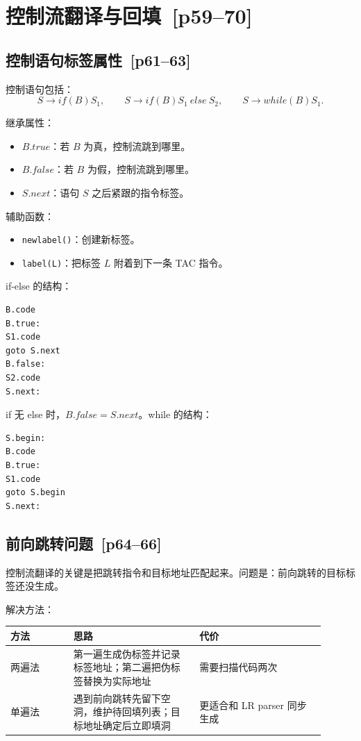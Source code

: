 \documentclass[UTF8,fontset=none,11pt]{ctexart}
\newcommand{\pg}[1]{\texorpdfstring{{\small\color{graytext}\,[p#1]}}{ [p#1]}}
\begin{document}
\section{控制流翻译与回填 \pg{59--70}}

\subsection{控制语句标签属性 \pg{61--63}}

控制语句包括：
\[
S\to if(B)S_1,\qquad S\to if(B)S_1\ else\ S_2,\qquad S\to while(B)S_1.
\]

继承属性：

\begin{itemize}
  \item \(B.true\)：若 \(B\) 为真，控制流跳到哪里。
  \item \(B.false\)：若 \(B\) 为假，控制流跳到哪里。
  \item \(S.next\)：语句 \(S\) 之后紧跟的指令标签。
\end{itemize}

辅助函数：

\begin{itemize}
  \item \texttt{newlabel()}：创建新标签。
  \item \texttt{label(L)}：把标签 \(L\) 附着到下一条 TAC 指令。
\end{itemize}

if-else 的结构：

\begin{verbatim}
B.code
B.true:
S1.code
goto S.next
B.false:
S2.code
S.next:
\end{verbatim}

if 无 else 时，\(B.false=S.next\)。while 的结构：

\begin{verbatim}
S.begin:
B.code
B.true:
S1.code
goto S.begin
S.next:
\end{verbatim}

\subsection{前向跳转问题 \pg{64--66}}

控制流翻译的关键是把跳转指令和目标地址匹配起来。问题是：前向跳转的目标标签还没生成。

解决方法：

\begin{longtable}{L{0.18\linewidth}L{0.36\linewidth}L{0.36\linewidth}}
\toprule
方法 & 思路 & 代价 \\
\midrule
两遍法 & 第一遍生成伪标签并记录标签地址；第二遍把伪标签替换为实际地址 & 需要扫描代码两次 \\
单遍法 & 遇到前向跳转先留下空洞，维护待回填列表；目标地址确定后立即填洞 & 更适合和 LR parser 同步生成 \\
\bottomrule
\end{longtable}
\end{document}
